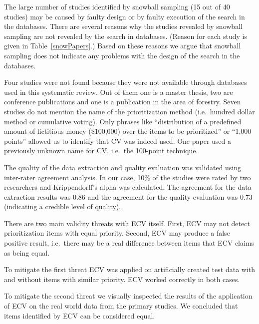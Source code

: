 The large number of studies identified by snowball sampling (15 out of 40 studies) may be caused by faulty design or by faulty execution of the search in the databases.
There are several reasons why the studies revealed by snowball sampling are not revealed by the search in databases. (Reason for each study is given in Table~\ref{snowPapers}.)
Based on these reasons we argue that snowball sampling does not indicate any problems with the design of the search in the databases.

Four studies were not found because they were not available through databases used in this systematic review. Out of them one is a master thesis, two are conference publications and one is a publication in the area of forestry.
Seven studies do not mention the name of the prioritization method (i.e.\ hundred dollar method or cumulative voting).
Only phrases like ``distribution of a predefined amount of fictitious money (\$100,000) over the items to be prioritized'' or ``1,000 points'' allowed us to identify that CV was indeed used. One paper used a previously unknown name for CV, i.e.\ the 100-point technique.

The quality of the data extraction and quality evaluation was validated using inter-rater agreement analysis.
In our case, 10\% of the studies were rated by two researchers and Krippendorff's alpha was calculated.
The agreement for the data extraction results was 0.86 and the agreement for the quality evaluation was 0.73 (indicating a credible level of quality).
%

There are two main validity threats with ECV itself.
First, ECV may not detect prioritization items with equal priority.
Second, ECV may produce a false positive result, i.e.\ there may be a real difference between items that ECV claims as being equal.

To mitigate the first threat ECV was applied on artificially created test data with and without items with similar priority.
ECV worked correctly in both cases.

To mitigate the second threat we visually inspected the results of the application of ECV on the real world data from the primary studies.
We concluded that items identified by ECV can be considered equal.

